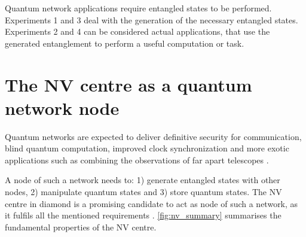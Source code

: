 \documentclass[a4paper]{article}
\begin{document}
Quantum network applications require entangled states to be performed. Experiments 1 and 3 deal with the generation of the necessary entangled states. Experiments 2 and 4 can be considered actual applications, that use the generated entanglement to perform a useful computation or task.


\section{The NV centre as a quantum network node}

Quantum networks are expected to deliver definitive security for communication, blind quantum computation, improved clock synchronization and more exotic applications such as combining the observations of far apart telescopes \cite{Wehner2018}.

A node of such a network needs to: 1) generate entangled states with other nodes, 2) manipulate quantum states and 3) store quantum states. The \ac{NV} centre in diamond is a promising candidate to act as node of such a network, as it fulfils all the mentioned requirements \cite{Awschalom2018}. \autoref{fig:nv_summary} summarises the fundamental properties of the \ac{NV} centre.
\end{document}
